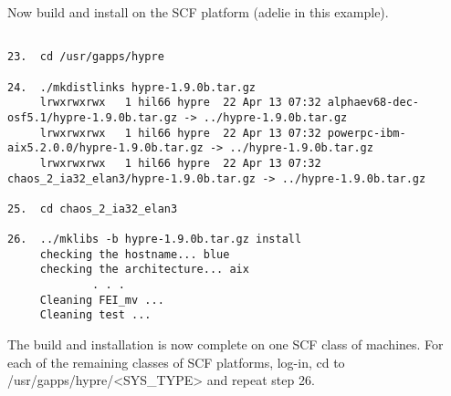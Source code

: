 Now build and install \hypre{} on the SCF platform (adelie in this example).
\begin{verbatim}

23.  cd /usr/gapps/hypre

24.  ./mkdistlinks hypre-1.9.0b.tar.gz
     lrwxrwxrwx   1 hil66 hypre  22 Apr 13 07:32 alphaev68-dec-osf5.1/hypre-1.9.0b.tar.gz -> ../hypre-1.9.0b.tar.gz
     lrwxrwxrwx   1 hil66 hypre  22 Apr 13 07:32 powerpc-ibm-aix5.2.0.0/hypre-1.9.0b.tar.gz -> ../hypre-1.9.0b.tar.gz
     lrwxrwxrwx   1 hil66 hypre  22 Apr 13 07:32 chaos_2_ia32_elan3/hypre-1.9.0b.tar.gz -> ../hypre-1.9.0b.tar.gz

25.  cd chaos_2_ia32_elan3

26.  ../mklibs -b hypre-1.9.0b.tar.gz install
     checking the hostname... blue
     checking the architecture... aix
             . . .
     Cleaning FEI_mv ...
     Cleaning test ...
\end{verbatim}
The build and installation is now complete on one SCF class of machines. For each of the 
remaining classes of SCF platforms, log-in, cd to /usr/gapps/hypre/<SYS\_TYPE> and repeat
step 26.

